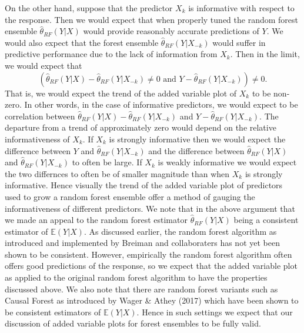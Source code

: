 \documentclass[12pt,twoside]{reedthesis}
\theoremstyle{definition}
\theoremstyle{definition}
\theoremstyle{definition}
\theoremstyle{remark}
\begin{document}
On the other hand, suppose that the predictor \(X_k\) is informative
with respect to the response. Then we would expect that when properly
tuned the random forest ensemble \(\hat{\theta}_{RF}(Y|X)\) would
provide reasonably accurate predictions of \(Y\). We would also expect
that the forest ensemble \(\hat{\theta}_{RF}(Y|X_{-k})\) would suffer in
predictive performance due to the lack of information from \(X_k\). Then
in the limit, we would expect that
\[(\hat{\theta}_{RF}(Y|X)-\hat{\theta}_{RF}(Y|X_{-k})\neq 0 \text{ and } Y-\hat{\theta}_{RF}(Y|X_{-k}))\neq 0.\]
That is, we would expect the trend of the added variable plot of \(X_k\)
to be non-zero. In other words, in the case of informative predictors,
we would expect to be correlation between
\(\hat{\theta}_{RF}(Y|X)-\hat{\theta}_{RF}(Y|X_{-k})\) and
\(Y-\hat{\theta}_{RF}(Y|X_{-k})\). The departure from a trend of
approximately zero would depend on the relative informativeness of
\(X_k\). If \(X_k\) is strongly informative then we would expect the
difference between \(Y\) and \(\hat{\theta}_{RF}(Y|X_{-k})\) and the
difference between \(\hat{\theta}_{RF}(Y|X)\) and
\(\hat{\theta}_{RF}(Y|X_{-k})\) to often be large. If \(X_k\) is weakly
informative we would expect the two differnces to often be of smaller
magnitude than when \(X_k\) is strongly informative. Hence visually the
trend of the added variable plot of predictors used to grow a random
forest ensemble offer a method of gauging the informativeness of
different predictors. We note that in the above argument that we made an
appeal to the random forest estimator \(\hat{\theta}_{RF}(Y|X)\) being a
consistent estimator of \(\mathbb{E}(Y|X)\). As discussed earlier, the
random forest algorithm as introduced and implemented by Breiman and
collaboraters has not yet been shown to be consistent. However,
empirically the random forest algorithm often offers good predictions of
the response, so we expect that the added variable plot as applied to
the original random forest algorithm to have the properties discussed
above. We also note that there are random forest variants such as Causal
Forest as introduced by Wager \& Athey (2017) which have been shown to
be consistent estimators of \(\mathbb{E}(Y|X)\). Hence in such settings
we expect that our discussion of added variable plots for forest
ensembles to be fully valid.
\end{document}
